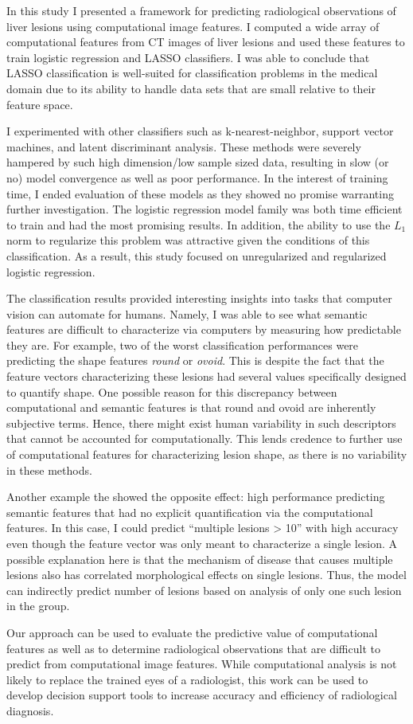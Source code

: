 In this study I presented a framework for predicting radiological observations of liver lesions using computational image features. I computed a wide array of computational features from CT images of liver lesions and used these features to train logistic regression and LASSO classifiers. I was able to conclude that LASSO classification is well-suited for classification problems in the medical domain due to its ability to handle data sets that are small relative to their feature space.

I experimented with other classifiers such as k-nearest-neighbor, support vector machines, and latent discriminant analysis. These methods were severely hampered by such high dimension/low sample sized data, resulting in slow (or no) model convergence as well as poor performance. In the interest of training time, I ended evaluation of these models as they showed no promise warranting further investigation. The logistic regression model family was both time efficient to train and had the most promising results. In addition, the ability to use the $L_1$ norm to regularize this problem was attractive given the conditions of this classification. As a result, this study focused on unregularized and regularized logistic regression. 

The classification results provided interesting insights into tasks that computer vision can automate for humans. Namely, I was able to see what semantic features are difficult to characterize via computers by measuring how predictable they are. For example, two of the worst classification performances were predicting the shape features \emph{round} or \emph{ovoid}. This is despite the fact that the feature vectors characterizing these lesions had several values specifically designed to quantify shape. One possible reason for this discrepancy between computational and semantic features is that round and ovoid are inherently subjective terms. Hence, there might exist human variability in such descriptors that cannot be accounted for computationally. This lends credence to further use of computational features for characterizing lesion shape, as there is no variability in these methods. 

Another example the showed the opposite effect: high performance predicting semantic features that had no explicit quantification via the computational features. In this case, I could predict ``multiple lesions > 10'' with high accuracy even though the feature vector was only meant to characterize a single lesion. A possible explanation here is that the mechanism of disease that causes multiple lesions also has correlated morphological effects on single lesions. Thus, the model can indirectly predict number of lesions based on analysis of only one such lesion in the group.

Our approach can be used to evaluate the predictive value of computational features as well as to determine radiological observations that are difficult to predict from computational image features. While computational analysis is not likely to replace the trained eyes of a radiologist, this work can be used to develop decision support tools to increase accuracy and efficiency of radiological diagnosis.




